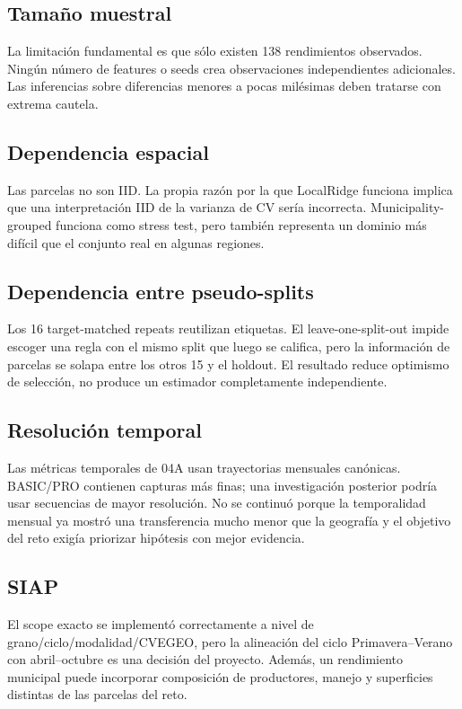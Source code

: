 \subsection{Tamaño muestral}

La limitación fundamental es que sólo existen 138 rendimientos observados. Ningún número de
features o seeds crea observaciones independientes adicionales. Las inferencias sobre
diferencias menores a pocas milésimas deben tratarse con extrema cautela.

\subsection{Dependencia espacial}

Las parcelas no son IID. La propia razón por la que LocalRidge funciona implica que una
interpretación IID de la varianza de CV sería incorrecta. Municipality-grouped funciona como
stress test, pero también representa un dominio más difícil que el conjunto real en algunas
regiones.

\subsection{Dependencia entre pseudo-splits}

Los 16 target-matched repeats reutilizan etiquetas. El leave-one-split-out impide escoger una
regla con el mismo split que luego se califica, pero la información de parcelas se solapa
entre los otros 15 y el holdout. El resultado reduce optimismo de selección, no produce un
estimador completamente independiente.

\subsection{Resolución temporal}

Las métricas temporales de 04A usan trayectorias mensuales canónicas. BASIC/PRO contienen
capturas más finas; una investigación posterior podría usar secuencias de mayor resolución.
No se continuó porque la temporalidad mensual ya mostró una transferencia mucho menor que la
geografía y el objetivo del reto exigía priorizar hipótesis con mejor evidencia.

\subsection{SIAP}

El scope exacto se implementó correctamente a nivel de grano/ciclo/modalidad/CVEGEO, pero la
alineación del ciclo Primavera--Verano con abril--octubre es una decisión del proyecto.
Además, un rendimiento municipal puede incorporar composición de productores, manejo y
superficies distintas de las parcelas del reto.

